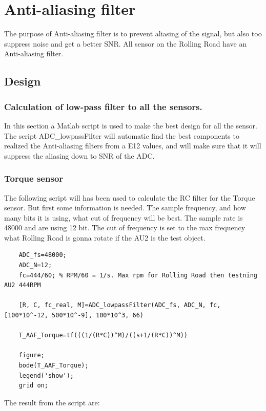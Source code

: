 \newpage
\section{Anti-aliasing filter}
The purpose of Anti-aliasing filter is to prevent aliasing of the signal, but also too suppress noise and get a better SNR. All sensor on the Rolling Road have an Anti-aliasing filter.  

\subsection{Design}

	
	\subsubsection{Calculation of low-pass filter to all the sensors.}
	
	In this section a Matlab script is used to make the best design for all the sensor.
	The script ADC\_lowpassFilter will automatic find the best components to realized the Anti-aliasing filters from a E12 values, and will make sure that it will suppress the aliasing down to SNR of the ADC.
	
	
		
	\subsubsection*{Torque sensor}
	
	The following script will has been used to calculate the RC filter for the Torque sensor. But first some information is needed. The sample frequency, and how many bits it is using, what cut of frequency will be best. 
	The sample rate is 48000 and are using 12 bit. The cut of frequency is set to the max frequency what Rolling Road is gonna rotate if the AU2 is the test object. 
	
	\begin{lstlisting}
	ADC_fs=48000;
	ADC_N=12;
	fc=444/60; % RPM/60 = 1/s. Max rpm for Rolling Road then testning AU2 444RPM
	
	[R, C, fc_real, M]=ADC_lowpassFilter(ADC_fs, ADC_N, fc, [100*10^-12, 500*10^-9], 100*10^3, 66)
	
	T_AAF_Torque=tf(((1/(R*C))^M)/((s+1/(R*C))^M))
	
	figure;
	bode(T_AAF_Torque);
	legend('show');
	grid on;
	\end{lstlisting}
	
	The result from the script are:
	
